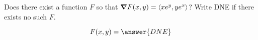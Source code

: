 \documentclass{ximera}
\author{David Guichard \and Neal Koblitz \and H. Jerome Keisler \and Albert Scheller \and Barry Balof \and Mike Wills \and Matthew Carr}
\begin{document}
\begin{exercise}




Does there exist a function $F$ so that $\boldsymbol\nabla F(x,y)=\left\langle xe^{y},ye^{x}\right\rangle$? Write DNE if there exists no such $F$. 

\begin{prompt}
\[
F(x,y)=\answer{DNE}
\]
\end{prompt}
\end{exercise}
\end{document}
